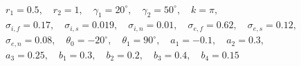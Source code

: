 $$
\begin{gathered}
r_1 = 0.5,\quad r_2 = 1,\quad \gamma_1 = 20^\circ,\quad \gamma_2 = 50^\circ,\quad k = \pi,\\
\sigma_{i,f} = 0.17,\quad \sigma_{i,s} = 0.019,\quad \sigma_{i,n} = 0.01,\quad \sigma_{e,f} = 0.62,\quad \sigma_{e,s} = 0.12,\\
\sigma_{e,n} = 0.08,\quad \theta_0 = -20^\circ,\quad \theta_1 = 90^\circ,\quad a_1 = -0.1,\quad a_2 = 0.3,\\
a_3 = 0.25,\quad b_1 = 0.3,\quad b_2 = 0.2,\quad b_3 = 0.4,\quad b_4 = 0.15
\end{gathered}
$$
